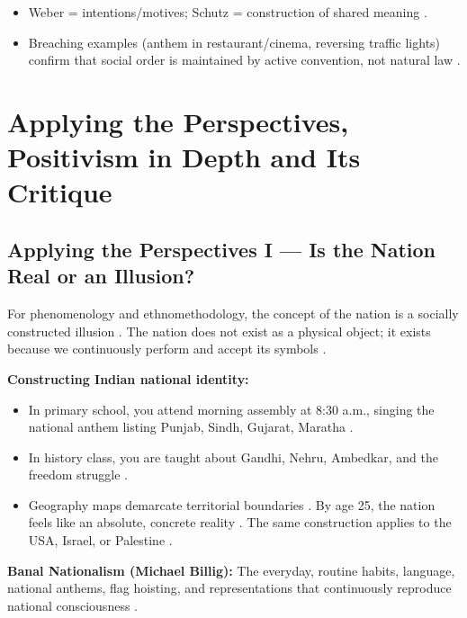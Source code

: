 \begin{QuickRevision}
\begin{itemize}
    \item Weber = intentions/motives; Schutz = construction of shared meaning .
    \item Breaching examples (anthem in restaurant/cinema, reversing traffic lights) confirm that social order is maintained by active convention, not natural law .
\end{itemize}
\end{QuickRevision}

\sectiondivider

\section{Applying the Perspectives, Positivism in Depth and Its Critique}

\subsection{Applying the Perspectives I --- Is the Nation Real or an Illusion?}
For phenomenology and ethnomethodology, the concept of the nation is a socially constructed illusion . The nation does not exist as a physical object; it exists because we continuously perform and accept its symbols .

\begin{ExampleBox}
\textbf{Constructing Indian national identity:}
\begin{itemize}
    \item In primary school, you attend morning assembly at 8:30 a.m., singing the national anthem listing Punjab, Sindh, Gujarat, Maratha .
    \item In history class, you are taught about Gandhi, Nehru, Ambedkar, and the freedom struggle .
    \item Geography maps demarcate territorial boundaries . By age 25, the nation feels like an absolute, concrete reality . The same construction applies to the USA, Israel, or Palestine .
\end{itemize}
\end{ExampleBox}

\begin{KeyConcept}
\textbf{Banal Nationalism (Michael Billig):} The everyday, routine habits, language, national anthems, flag hoisting, and representations that continuously reproduce national consciousness .
\end{KeyConcept}

